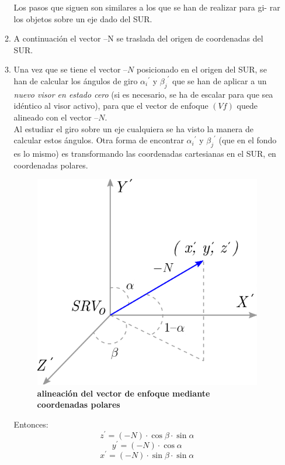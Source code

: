 \begin{itemize}
\begin{enumerate}
        Los pasos que siguen son similares a los que se han de realizar para gi- rar los objetos sobre un eje dado del SUR.
        
        \item A continuación el vector –N se traslada del origen de coordenadas del SUR.
        
        \item Una vez que se tiene el vector $–N$ posicionado en el origen del SUR, se han de calcular los ángulos de giro ${{\alpha}_i}^{\prime}$ y ${{\beta}_j}^{\prime}$ que se han de aplicar a un \textit{nuevo visor en estado cero} (si es necesario, se ha de escalar para que sea idéntico al visor activo), para que el vector de enfoque $(Vf)$ quede alineado con el vector $–N$.\\
        Al estudiar el giro sobre un eje cualquiera se ha visto la manera de calcular estos ángulos. Otra forma de encontrar ${{\alpha}_i}^{\prime}$ y ${{\beta}_j}^{\prime}$ (que en el fondo es lo mismo) es transformando las coordenadas cartesianas en el SUR, en coordenadas polares. 
        
        \begin{figure}[h]
        \includegraphics[width=10cm]{Img/GEO/geo-visor-11.png}
        \centering
        \caption{\footnotesize{\textbf{alineación del vector de enfoque mediante coordenadas polares}}}
        \label{geo-visor11}
        \end{figure}
        
        Entonces:
        $${z^{\prime}} = (-N) \cdot \cos{\beta} \cdot \sin{\alpha} $$
        $${y^{\prime}} = (-N) \cdot \cos{\alpha}$$
        $${x^{\prime}} = (-N) \cdot \sin{\beta} \cdot \sin{\alpha}$$
        

\end{enumerate}
\end{itemize}
